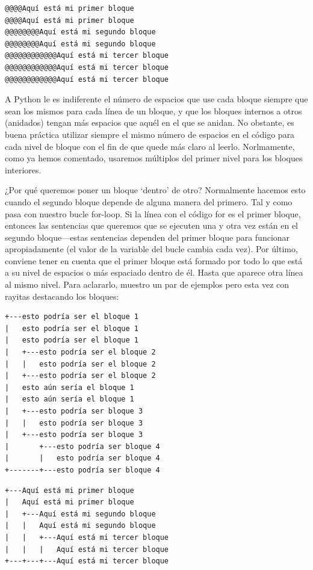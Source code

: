 \begin{listing}
\begin{verbatim}
@@@@Aquí está mi primer bloque
@@@@Aquí está mi primer bloque
@@@@@@@@Aquí está mi segundo bloque
@@@@@@@@Aquí está mi segundo bloque
@@@@@@@@@@@@Aquí está mi tercer bloque
@@@@@@@@@@@@Aquí está mi tercer bloque
@@@@@@@@@@@@Aquí está mi tercer bloque
\end{verbatim}
\end{listing}

A Python le es indiferente el número de espacios que use cada bloque siempre que sean los mismos para cada línea de un bloque, y que los bloques internos a otros (anidados) tengan más espacios que aquél en el que se anidan. No obstante, es buena práctica utilizar siempre el mismo número de espacios en el código para cada nivel de bloque con el fin de que quede más claro al leerlo. Norlmamente, como ya hemos comentado, usaremos múltiplos del primer nivel para los bloques interiores.

¿Por qué queremos poner un bloque `dentro' de otro?  Normalmente hacemos esto cuando el segundo bloque depende de alguna manera del primero.  Tal y como pasa con nuestro bucle for-loop.  Si la línea con el código for es el primer bloque, entonces las sentencias que queremos que se ejecuten una y otra vez están en el segundo bloque---estas sentencias dependen del primer bloque para funcionar apropiadamente (el valor de la variable del bucle cambia cada vez).
Por último, conviene tener en cuenta que el primer bloque está formado por todo lo que está a su nivel de espacios o más espaciado dentro de él. Hasta que aparece otra línea al mismo nivel.
Para aclararlo, muestro un par de ejemplos pero esta vez con rayitas destacando los bloques:

\begin{listing}
\begin{verbatim}
+---esto podría ser el bloque 1
|   esto podría ser el bloque 1
|   esto podría ser el bloque 1
|   +---esto podría ser el bloque 2
|   |   esto podría ser el bloque 2
|   +---esto podría ser el bloque 2
|   esto aún sería el bloque 1
|   esto aún sería el bloque 1
|   +---esto podría ser bloque 3
|   |   esto podría ser bloque 3
|   +---esto podría ser bloque 3
|       +---esto podría ser bloque 4
|       |   esto podría ser bloque 4
+-------+---esto podría ser bloque 4
\end{verbatim}
\end{listing}


\begin{listing}
\begin{verbatim}
+---Aquí está mi primer bloque
|   Aquí está mi primer bloque
|   +---Aquí está mi segundo bloque
|   |   Aquí está mi segundo bloque
|   |   +---Aquí está mi tercer bloque
|   |   |   Aquí está mi tercer bloque
+---+---+---Aquí está mi tercer bloque
\end{verbatim}
\end{listing}


